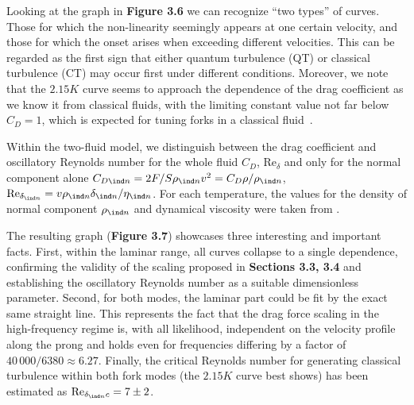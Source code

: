 Looking at the graph in {\sffamily\textbf{Figure 3.6}} we can recognize ``two types'' of curves. Those for which the non-linearity seemingly appears at one certain velocity, and those for which the onset arises when exceeding different velocities. This can be regarded as the first sign that either quantum turbulence (QT) or classical turbulence (CT) may occur first under different conditions. Moreover, we note that the $ 2.15 \unit{K}$ curve seems to approach the dependence of the drag coefficient as we know it from classical fluids, with the limiting constant value not far below $ C_D = 1 $, which is expected for tuning forks in a classical fluid~\cite{PraguePRB}.

Within the two-fluid model, we distinguish between the drag coefficient and oscillatory Reynolds number for the whole fluid $ C_{D}$, $ \text{Re}_{\delta} $ and only for the normal component alone $ C_{D{\ind n}} = 2F/S\rho_{\ind n}v^2 = C_D \rho/\rho_{\ind n} $, $ \text{Re}_{\delta_{\ind n}} = v\rho_{\ind n}\delta_{\ind n}/\eta_{\ind n} $. For each temperature, the values for the density of normal component $ \rho_{\ind n} $ and dynamical viscosity were taken from \cite{donnelly}.

The resulting graph ({\sffamily\textbf{Figure 3.7}}) showcases three interesting and important facts. First, within the laminar range, all curves collapse to a single dependence, confirming the validity of the scaling proposed in {\sffamily\textbf{Sections 3.3, 3.4}} and establishing the oscillatory Reynolds number as a suitable dimensionless parameter. Second, for both modes, the laminar part could be fit by the exact same straight line. This represents the fact that the drag force scaling in the high-frequency regime is, with all likelihood, independent on the velocity profile along the prong and holds even for frequencies differing by a factor of $40\,000/6380\approx 6.27 $. Finally, the critical Reynolds number for generating classical turbulence within both fork modes (the $ 2.15\unit{K} $ curve best shows) has been estimated as $ \text{Re}_{\delta_{\ind n}c}=7\pm 2 $.




